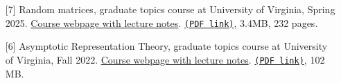 \begin{enumerate}
















\item[{[7]}]
Random matrices, graduate topics course at University of Virginia, Spring 2025. \href{https://lpetrov.cc/rmt25/}{Course webpage with lecture notes}. \href{https://storage.lpetrov.cc/papers/lec07-rmt2025-lectures-combined.pdf}{\texttt{(PDF link)}}, 3.4MB, 232 pages.

















































\item[{[6]}]
Asymptotic Representation Theory, graduate topics course at University of Virginia, Fall 2022. \href{https://lpetrov.cc/art2022/}{Course webpage with lecture notes}. \href{https://storage.lpetrov.cc/papers/lec06-ART_Lectures.pdf}{\texttt{(PDF link)}}, 102 MB.


























\end{enumerate}
